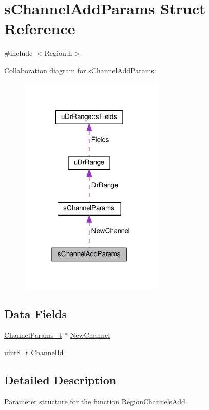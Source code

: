 \hypertarget{structsChannelAddParams}{}\section{s\+Channel\+Add\+Params Struct Reference}
\label{structsChannelAddParams}


{\ttfamily \#include $<$Region.\+h$>$}



Collaboration diagram for s\+Channel\+Add\+Params\+:
\nopagebreak
\begin{figure}[H]
\begin{center}
\leavevmode
\includegraphics[width=195pt]{structsChannelAddParams__coll__graph}
\end{center}
\end{figure}
\subsection*{Data Fields}
\begin{DoxyCompactItemize}
\item 
\hyperlink{group__LORAMAC_ga1360ca6f82c6d125ea43a9dad9b56184}{Channel\+Params\+\_\+t} $\ast$ \hyperlink{structsChannelAddParams_a137bee029b5796735c1689c969413e63}{New\+Channel}
\item 
uint8\+\_\+t \hyperlink{structsChannelAddParams_a5f26cba04f1453e2b6db2ab73389238b}{Channel\+Id}
\end{DoxyCompactItemize}


\subsection{Detailed Description}
Parameter structure for the function Region\+Channels\+Add. 

